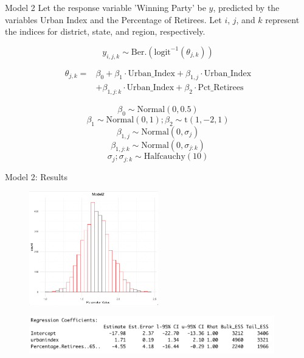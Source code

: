 \documentclass{beamer}
\begin{document}
\begin{frame}{Model 2}
    Let the response variable 'Winning Party' be \(y\), predicted by the variables Urban Index and the Percentage of Retirees. Let \(i\), \(j\), and \(k\) represent the indices for district, state, and region, respectively.

    \[
    y_{i,j,k} \sim \text{Ber.}\left(\text{logit}^{-1}(\theta_{j,k})\right)
    \]

\[
\begin{aligned}
\theta_{j,k} =    &\beta_0 + \beta_1 \cdot \text{Urban\_Index} + \beta_{1,j} \cdot \text{Urban\_Index} \\
    &+ \beta_{1,j:k} \cdot \text{Urban\_Index} + \beta_2 \cdot \text{Pct\_Retirees}
\end{aligned}
\]



    \[\beta_0 \sim \text{Normal}(0, 0.5)\]
    \[\beta_1 \sim \text{Normal}(0, 1); \beta_2 \sim \text{t}(1,-2,1)\]
    \[\beta_{1,j} \sim \text{Normal}(0, \sigma_j)\]
    \[\beta_{1,j:k} \sim \text{Normal}(0, \sigma_{j:k})\]
    \[ \sigma_j; \sigma_{j:k} \sim \text{Halfcauchy}(10)\]

    
\end{frame}



\begin{frame}{Model 2: Results}
    \begin{figure}
        \includegraphics[width=0.5\textwidth]{plots/model2_postui.png}
    \end{figure}
    \begin{figure}
        \includegraphics[width=0.95\textwidth]{plots/model2_coeff.png}
    \end{figure}
\end{frame}
\end{document}
